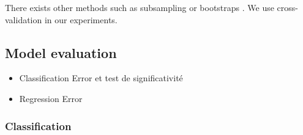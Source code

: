 \noindent There exists other methods such as subsampling or bootstraps \cite{Duda1973,Dreyfus2006}. We use cross-validation in our experiments.

\subsection{Model evaluation}
\begin{itemize}
	\item Classification Error et test de significativité
	\item Regression Error
\end{itemize}


\subsubsection{Classification}
%
%
%
%
%
%
%

